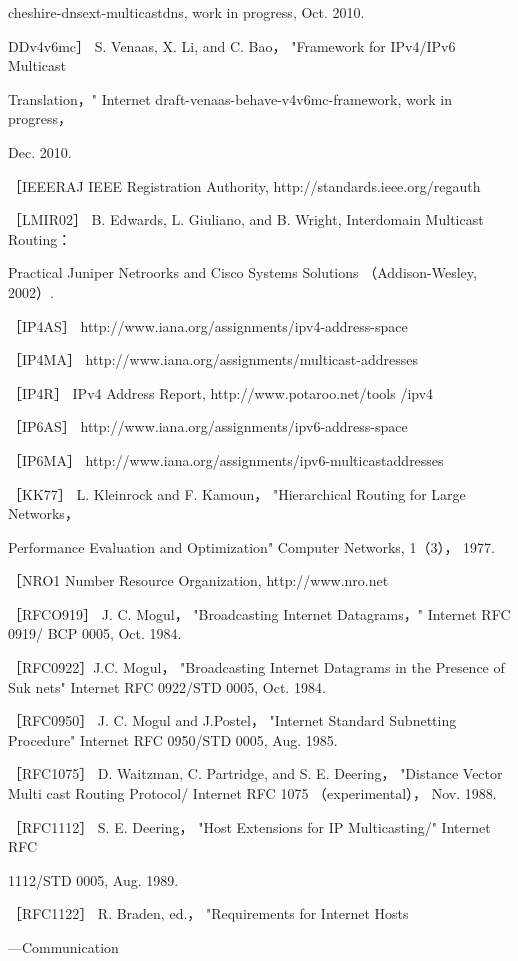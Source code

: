 cheshire-dnsext-multicastdns, work in progress, Oct. 2010.

DDv4v6mc］ S. Venaas, X. Li, and C. Bao， "Framework for IPv4/IPv6 Multicast

Translation，" Internet draft-venaas-behave-v4v6mc-framework, work in progress，

Dec. 2010.

［IEEERAJ IEEE Registration Authority, http://standards.ieee.org/regauth

［LMIR02］ B. Edwards, L. Giuliano, and B. Wright, Interdomain Multicast Routing：

Practical Juniper Netroorks and Cisco Systems Solutions （Addison-Wesley, 2002）.

［IP4AS］ http://www.iana.org/assignments/ipv4-address-space

［IP4MA］ http://www.iana.org/assignments/multicast-addresses

［IP4R］ IPv4 Address Report, http://www.potaroo.net/tools /ipv4

［IP6AS］ http://www.iana.org/assignments/ipv6-address-space

［IP6MA］ http://www.iana.org/assignments/ipv6-multicastaddresses

［KK77］ L. Kleinrock and F. Kamoun， "Hierarchical Routing for Large Networks，

Performance Evaluation and Optimization" Computer Networks, 1（3）， 1977.

［NRO1 Number Resource Organization, http://www.nro.net

［RFCO919］ J. C. Mogul， "Broadcasting Internet Datagrams，" Internet RFC 0919/
BCP 0005, Oct. 1984.

［RFC0922］J.C. Mogul， "Broadcasting Internet Datagrams in the Presence of Suk
nets" Internet RFC 0922/STD 0005, Oct. 1984.

［RFC0950］ J. C. Mogul and J.Postel， "Internet Standard Subnetting Procedure"
Internet RFC 0950/STD 0005, Aug. 1985.

［RFC1075］ D. Waitzman, C. Partridge, and S. E. Deering， "Distance Vector Multi
cast Routing Protocol/ Internet RFC 1075 （experimental）， Nov. 1988.

［RFC1112］ S. E. Deering， "Host Extensions for IP Multicasting/" Internet RFC

1112/STD 0005, Aug. 1989.

［RFC1122］ R. Braden, ed.， "Requirements for Internet Hosts

—Communication

